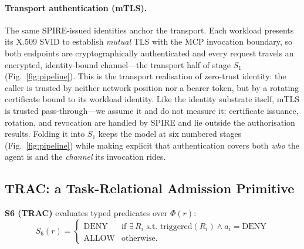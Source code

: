 \documentclass[sigconf,review,anonymous]{acmart}
\begin{document}
\paragraph{Transport authentication (mTLS).} The same SPIRE-issued identities anchor the transport. Each workload presents its X.509 SVID to establish \emph{mutual} TLS with the MCP invocation boundary, so both endpoints are cryptographically authenticated and every request travels an encrypted, identity-bound channel---the transport half of stage $S_1$ (Fig.~\ref{fig:pipeline}). This is the transport realisation of zero-trust identity: the caller is trusted by neither network position nor a bearer token, but by a rotating certificate bound to its workload identity. Like the identity substrate itself, mTLS is trusted pass-through---we assume it and do not measure it; certificate issuance, rotation, and revocation are handled by SPIRE and lie outside the authorisation results. Folding it into $S_1$ keeps the model at six numbered stages (Fig.~\ref{fig:pipeline}) while making explicit that authentication covers both \emph{who} the agent is and the \emph{channel} its invocation rides.

\subsection{TRAC: a Task-Relational Admission Primitive}
\label{sec:trac}
\label{sec:capability}
\label{sec:alignment}


\textbf{S6 (TRAC)} evaluates typed predicates over $\Phi(r)$:
\begin{equation}
S_6(r) = \begin{cases}
\text{DENY} & \text{if } \exists\, R_i \text{ s.t. } \text{triggered}(R_i) \land a_i = \text{DENY} \\
\text{ALLOW} & \text{otherwise.}
\end{cases}
\label{eq:trac}
\end{equation}
\end{document}
